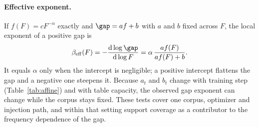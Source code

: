 \paragraph{Effective exponent.}
If $f(F)=cF^{-\alpha}$ exactly and $\gap=af+b$ with $a$ and $b$ fixed across $F$, the local exponent of a positive gap is
\begin{equation}
\beta_{\mathrm{eff}}(F)=-\frac{\mathrm d\log\gap}{\mathrm d\log F}
=\alpha\,\frac{af(F)}{af(F)+b}.
\label{eq:coverage-effective-exponent}
\end{equation}
It equals $\alpha$ only when the intercept is negligible; a positive intercept flattens the gap and a negative one steepens it. Because $a_t$ and $b_t$ change with training step (Table~\ref{tab:affine}) and with table capacity, the observed gap exponent can change while the corpus stays fixed. These tests cover one corpus, optimizer and injection path, and within that setting support coverage as a contributor to the frequency dependence of the gap.
